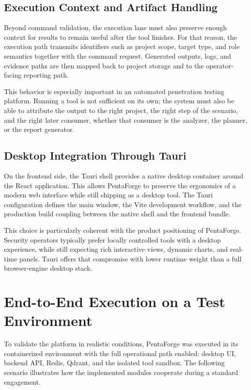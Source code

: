\documentclass[12pt,a4paper]{report}
\begin{document}
\subsection{Execution Context and Artifact Handling}

Beyond command validation, the execution lane must also preserve enough context for
results to remain useful after the tool finishes. For that reason, the execution path
transmits identifiers such as project scope, target type, and role semantics together
with the command request. Generated outputs, logs, and evidence paths are then mapped
back to project storage and to the operator-facing reporting path.

This behavior is especially important in an automated penetration testing platform.
Running a tool is not sufficient on its own; the system must also be able to
attribute the output to the right project, the right step of the scenario, and the
right later consumer, whether that consumer is the analyzer, the planner, or the
report generator.

\subsection{Desktop Integration Through Tauri}

On the frontend side, the Tauri shell provides a native desktop container around the
React application. This allows PentaForge to preserve the ergonomics of a modern web
interface while still shipping as a desktop tool. The Tauri configuration defines
the main window, the Vite development workflow, and the production build coupling
between the native shell and the frontend bundle.

This choice is particularly coherent with the product positioning of PentaForge.
Security operators typically prefer locally controlled tools with a desktop
experience, while still expecting rich interactive views, dynamic charts, and
real-time panels. Tauri offers that compromise with lower runtime weight than a full
browser-engine desktop stack.

\section{End-to-End Execution on a Test Environment}

To validate the platform in realistic conditions, PentaForge was executed in its
containerized environment with the full operational path enabled: desktop UI,
backend API, Redis, Qdrant, and the isolated tool sandbox. The following scenario
illustrates how the implemented modules cooperate during a standard engagement.
\end{document}
